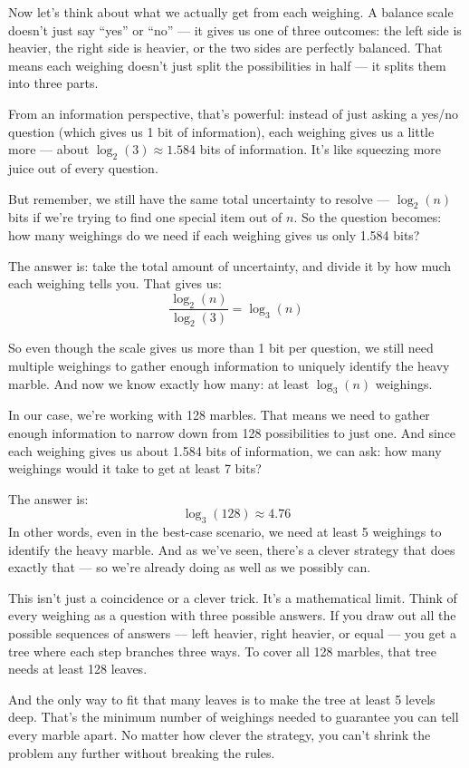 Now let’s think about what we actually get from each weighing. A balance scale doesn’t just say “yes” or “no” — it gives us one of three outcomes: the left side is heavier, the right side is heavier, or the two sides are perfectly balanced. That means each weighing doesn’t just split the possibilities in half — it splits them into three parts.

From an information perspective, that’s powerful: instead of just asking a yes/no question (which gives us 1 bit of information), each weighing gives us a little more — about \( \log_2(3) \approx 1.584 \) bits of information. It’s like squeezing more juice out of every question.

But remember, we still have the same total uncertainty to resolve — \( \log_2(n) \) bits if we’re trying to find one special item out of \( n \). So the question becomes: how many weighings do we need if each weighing gives us only 1.584 bits?

The answer is: take the total amount of uncertainty, and divide it by how much each weighing tells you. That gives us:
\[
\frac{\log_2(n)}{\log_2(3)} = \log_3(n)
\]

So even though the scale gives us more than 1 bit per question, we still need multiple weighings to gather enough information to uniquely identify the heavy marble. And now we know exactly how many: at least \( \log_3(n) \) weighings.


In our case, we’re working with 128 marbles. That means we need to gather enough information to narrow down from 128 possibilities to just one. And since each weighing gives us about 1.584 bits of information, we can ask: how many weighings would it take to get at least 7 bits?

The answer is:
\[
\log_3(128) \approx 4.76
\]
In other words, even in the best-case scenario, we need at least 5 weighings to identify the heavy marble. And as we’ve seen, there’s a clever strategy that does exactly that — so we’re already doing as well as we possibly can.

This isn’t just a coincidence or a clever trick. It’s a mathematical limit. Think of every weighing as a question with three possible answers. If you draw out all the possible sequences of answers — left heavier, right heavier, or equal — you get a tree where each step branches three ways. To cover all 128 marbles, that tree needs at least 128 leaves.

And the only way to fit that many leaves is to make the tree at least 5 levels deep. That’s the minimum number of weighings needed to guarantee you can tell every marble apart. No matter how clever the strategy, you can’t shrink the problem any further without breaking the rules.

